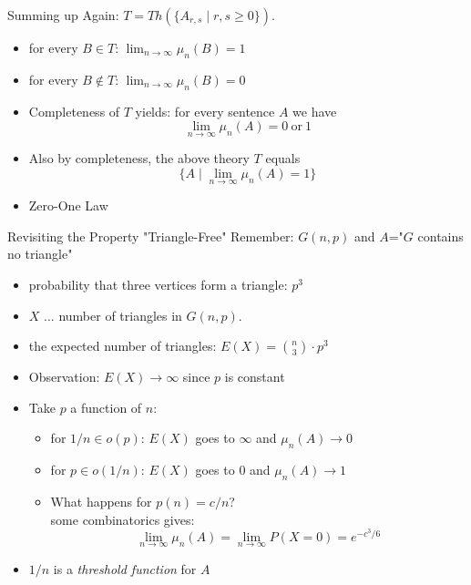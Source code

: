 \documentclass[draft]{beamer}
\begin{document}
\begin{frame}{Summing up}
  Again: $T=Th(\{A_{r,s}\mid r,s\geq 0\})$. 
  \begin{itemize}
    \item for every $B\in T$: $\lim_{n\rightarrow\infty} \mu_n(B)=1$
    \item for every $B\notin T$: $\lim_{n\rightarrow\infty} \mu_n(B)=0$
    \item Completeness of $T$ yields: for every sentence $A$ we have
  $$\lim_{n\rightarrow\infty}\mu_n(A)=0\mathrm{\ or\ } 1$$
    \pause
    \item Also by completeness, the above theory $T$ equals
      $$\{A\mid\lim_{n\rightarrow\infty}\mu_n(A)=1\}$$
    \pause
    \item Zero-One Law
  \end{itemize}

\end{frame}



\begin{frame}{Revisiting the Property "Triangle-Free"}
  Remember: $G(n,p)$ and $A$="$G$ contains no triangle"
  \pause
  \begin{itemize}
    \item probability that three vertices form a triangle: $p^3$
    \pause
    \item $X$ ... number of triangles in $G(n,p)$.
    \item the expected number of triangles: $E(X)={n \choose 3}\cdot p^3$
    \pause
    \item Observation: $E(X)\rightarrow\infty$ since $p$ is constant
    \item Take $p$ a function of $n$:  
	\begin{itemize}
	  \item for $1/n\in o(p)$: $E(X)$ goes to $\infty$ and $\mu_n(A)\rightarrow 0$
	  \pause
	  \item for $p\in o(1/n)$: $E(X)$ goes to $0$ and $\mu_n(A)\rightarrow 1$
          \pause
          \item What happens for $p(n)=c/n$? \pause\\some combinatorics gives: 
      $$\lim_{n\rightarrow\infty}\mu_n(A)=\lim_{n\rightarrow\infty}P(X=0)=e^{-c^3/6}$$
  	\end{itemize}
    \item $1/n$ is a \emph{threshold function} for $A$
  \end{itemize}
\end{frame}
\end{document}
